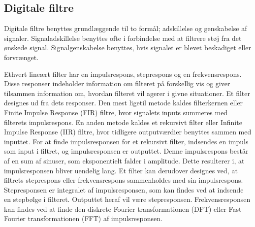 \subsection{Digitale filtre}

Digitale filtre benyttes grundlæggende til to formål; adskillelse og genskabelse af signaler. Signaladskillelse %
benyttes ofte i forbindelse med at filtrere støj fra det ønskede signal. 
Signalgenskabelse benyttes, hvis signalet er blevet beskadiget eller forvrænget.  \citep{Smith1997}

Ethvert lineært filter har en impulsrespons, steprespons og en frekvensrespons. Disse responser indeholder information om filteret på forskellig vis og giver tilsammen information om, hvordan filteret vil agerer i givne situationer. \citep{Smith1997} Et filter designes ud fra dets responser. Den mest ligetil metode kaldes filterkernen eller Finite Impulse Response (FIR) filtre, hvor signalets inputs summeres med filterets impulsrespons. En anden metode kaldes et rekursivt filter eller Infinite Impulse Response (IIR) filtre, hvor tidligere outputværdier benyttes sammen med inputtet. For at finde impulsresponsen for et rekursivt filter, indsendes en impuls som input i filtret, og impulsresponsen er outputtet. Denne impulsrespons består af en sum af sinuser, som eksponentielt falder i amplitude. Dette resulterer i, at impulsresponsen bliver uendelig lang. \citep{Smith1997,Blandford2013} \newline
Et filter kan derudover designes ved, at filtrets steprespons eller frekvensrespons sammenholdes med sin impulsrespons. Stepresponsen er integralet af impulsresponsen, som kan findes ved at indsende en stepbølge i filteret. Outputtet heraf vil være stepresponsen. Frekvensresponsen kan findes ved at finde den diskrete Fourier transformationen (DFT) eller Fast Fourier transformationen (FFT) af impulsresponsen. \citep{Smith1997} %

